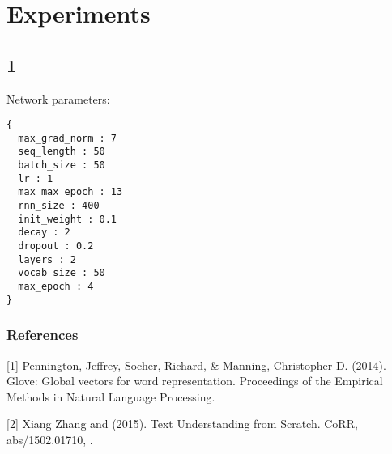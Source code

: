 \documentclass{article} %
\begin{document}
\section{Experiments}
\subsection{1} 
Network parameters:	
\begin{Verbatim}
{
  max_grad_norm : 7
  seq_length : 50
  batch_size : 50
  lr : 1
  max_max_epoch : 13
  rnn_size : 400
  init_weight : 0.1
  decay : 2
  dropout : 0.2
  layers : 2
  vocab_size : 50
  max_epoch : 4
}
\end{Verbatim}

\subsubsection*{References}

\small{

[1] Pennington, Jeffrey, Socher, Richard, \& Manning, Christopher D. (2014). Glove: Global vectors for word representation. Proceedings of the Empirical Methods in Natural Language Processing.

[2] Xiang Zhang and (2015). Text Understanding from Scratch. CoRR, abs/1502.01710, .
}
\end{document}
